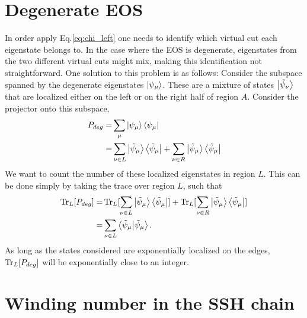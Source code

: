 \documentclass[twocolumn,amsmath,longbibliography,amssymb,superscriptaddress]{revtex4-1}
\begin{document}
\section{Degenerate EOS}\label{app:loc}

In order apply Eq.\eqref{eq:chi_left} one needs to identify  which virtual cut each eigenstate belongs to. In the case where the EOS is degenerate, eigenstates from the two different virtual cuts might mix, making this identification not straightforward. One solution to this problem is as follows: Consider the subspace spanned by the degenerate eigenstates $\ket{\psi_\mu}$. These are a mixture of states $\ket{\tilde{\psi}_\nu}$ that are localized either on the left or on the right half of region $A$. Consider the projector onto this subspace,
\begin{align}
P_{deg} =& \sum_\mu \ket{\psi_\mu}\bra{\psi_{\mu}} \nonumber \\
=&  \sum_{\nu \in L} \ket{\tilde{\psi}_\mu}\bra{\tilde{\psi}_{\mu}}+ \sum_{\nu \in R} \ket{\tilde{\psi}_\mu}\bra{\tilde{\psi}_{\mu}} 
\end{align}
We want to count the number of these localized eigenstates in region $L$. This can be done simply by taking the trace over region $L$, such that
\begin{align}
\Tr_L [P_{deg} ]=&  \Tr_L[ \sum_{\nu \in L} \ket{\tilde{\psi}_\mu}\bra{\tilde{\psi}_{\mu}}]+ \Tr_L[ \sum_{\nu \in R} \ket{\tilde{\psi}_\mu}\bra{\tilde{\psi}_{\mu}} ] \\
=&  \sum_{\nu \in L} \bra{\tilde{\psi}_{\mu}} \ket{\tilde{\psi}_\mu} .
\end{align}
As long as the states considered are exponentially localized on the edges, $\Tr_L [P_{deg} ]$ will be exponentially close to an integer. 

\section{Winding number in the SSH chain}
\label{appendix:winding_ssh}
\end{document}
